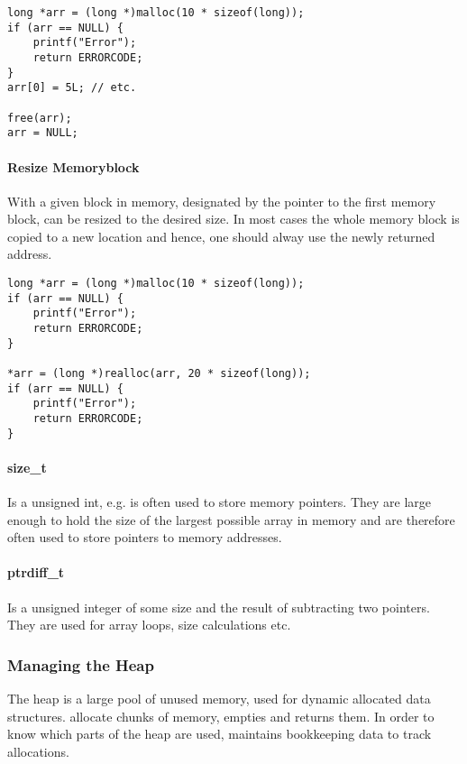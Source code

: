 \begin{lstlisting}
long *arr = (long *)malloc(10 * sizeof(long));
if (arr == NULL) {
    printf("Error");
    return ERRORCODE;
}
arr[0] = 5L; // etc.

free(arr);
arr = NULL;
\end{lstlisting}

\paragraph{Resize Memoryblock}
With  a given block in memory, designated by the pointer to the first memory block, can be resized to the desired size. In most cases the whole memory block is copied to a new location and hence, one should alway use the newly returned address.

\begin{lstlisting}
long *arr = (long *)malloc(10 * sizeof(long));
if (arr == NULL) {
    printf("Error");
    return ERRORCODE;
}

*arr = (long *)realloc(arr, 20 * sizeof(long));
if (arr == NULL) {
    printf("Error");
    return ERRORCODE;
}
\end{lstlisting}

\paragraph{size\_t}
Is a unsigned int, e.g.  is often used to store memory pointers. They are large enough to hold the size of the largest possible array in memory and are therefore often used to store pointers to memory addresses.

\paragraph{ptrdiff\_t}
Is a unsigned integer of some size and the result of subtracting two pointers. They are used for array loops, size calculations etc.

\subsubsection{Managing the Heap}
The heap is a large pool of unused memory, used for dynamic allocated data structures.  allocate chunks of memory,  empties and returns them. In order to know which parts of the heap are used,  maintains bookkeeping data to track allocations.

